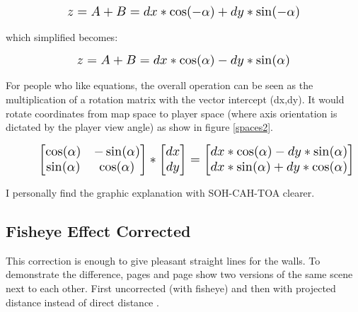 \begin{figure}[H]
  \centering
  \begin{equation*}
    \scalebox{1.3}{
$z = A + B = dx * \cos(-\alpha) + dy * \sin(-\alpha) $ 
 }
  \end{equation*}
\end{figure}
which simplified becomes: 

\begin{figure}[H]
  \centering
  \begin{equation*}
    \scalebox{1.3}{
$z = A + B = dx * \cos(\alpha) - dy * \sin(\alpha) $
 }
  \end{equation*}
\end{figure}
\par
For people who like equations, the overall operation can be seen as the multiplication of a rotation matrix with the vector intercept (dx,dy). It would rotate coordinates from map space to player space (where axis orientation is dictated by the player view angle) as show in figure \ref{spaces2}. \label{rotatematrix}
\begin{figure}[H]
  \centering
  \begin{equation*}
    \scalebox{1.3}{
    $
      \begin{bmatrix} 
        \cos(\alpha) & -\sin(\alpha) \\ 
        \sin(\alpha) & \cos(\alpha) 
      \end{bmatrix} 
       *
      \begin{bmatrix} 
        dx \\ 
        dy 
      \end{bmatrix}
       =
      \begin{bmatrix} 
        dx*\cos(\alpha) - dy*\sin(\alpha) \\ 
        dx*\sin(\alpha) + dy*\cos(\alpha) 
      \end{bmatrix} 
      $
    }
  \end{equation*}
\end{figure}
\par
I personally find the graphic explanation with SOH-CAH-TOA clearer.\\
\par
\subsection{Fisheye Effect Corrected}
This correction is enough to give pleasant straight lines for the walls. To demonstrate the difference, pages \pageref{fish_eye_corrected} and page \pageref{wolf3d_7_fullframe} show two versions of the same scene next to each other. First uncorrected (with fisheye) and then with projected distance  instead of direct distance .\\
\par
\pagebreak

